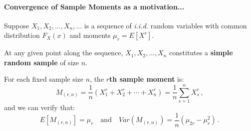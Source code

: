 \documentclass[notes=show,smaller,handout]{beamer}\usepackage[]{graphicx}\usepackage[]{color}
\newenvironment{stepitemize}{\begin{itemize}[<+->]}{\end{itemize} }
\begin{document}
\begin{frame}{\secname}
  \framesubtitle{Convergence of Sample Moments as a motivation...}

  Suppose $X_{1},X_{2},...,X_{n},...$ is a sequence of \textit{i.i.d.} random variables with common distribution $F_X(x)$ and moments $\mu_r=E
  [X^r]$.

  \medskip

  At any given point along the sequence, $X_{1},X_{2},...,X_{n}$ constitutes a \textbf{simple random sample} of size $n$.

  \medskip

  For each fixed sample size $n$, the \textbf{$r$th sample moment} is:
  \begin{equation*}
  M_{(r,n)}=\frac{1}{n}\left( X_{1}^r+X_{2}^r+\cdots +X_{n}^r\right)=\frac{1}{n}\sum_{s=1}^nX_s^r\,,
  \end{equation*}
  and we can verify that:
  $$
  E[M_{(r,n)}]=\mu_r\quad\text{and}\quad Var(M_{(r,n)})=\frac{1}{n}(\mu_{2r}-\mu_r^2)\,.
  $$
\end{frame}



%
%
%
%
%
%
%
\end{document}
